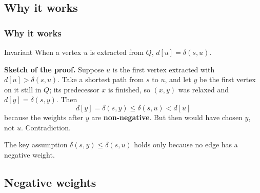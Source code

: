 \documentclass[aspectratio=169,10pt,compress]{beamer}
\begin{document}

\subsection[Correctness]{Why it works}




\begin{frame}[t,fragile] \frametitle{Why it works}
  \begin{block}{Invariant}
    When a vertex $u$ is extracted from $Q$, $d[u] = \delta(s, u)$.
  \end{block}

  \vspace{0.3em}
  \textbf{Sketch of the proof.} Suppose $u$ is the first vertex extracted with $d[u] > \delta(s, u)$.
  Take a shortest path from $s$ to $u$, and let $y$ be the first vertex on it still in $Q$;
  its predecessor $x$ is finished, so $(x, y)$ was relaxed and $d[y] = \delta(s, y)$. Then
  \[
  	d[y] = \delta(s, y) \le \delta(s, u) < d[u]
  \]
  because the weights after $y$ are \textbf{non-negative}. But then \FExtractMin would have chosen $y$,
  not $u$. Contradiction.

  \vspace{0.4em}
  \begin{alertblock}{The key assumption}
    \small $\delta(s, y) \le \delta(s, u)$ holds only because no edge has a negative weight.
  \end{alertblock}
\end{frame}

\subsection[Negative]{Negative weights}
\end{document}
